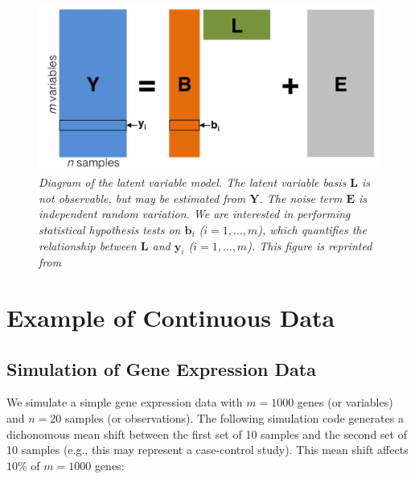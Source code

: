 \documentclass{article}\usepackage[]{graphicx}\usepackage[]{color}
\newcommand{\bY}{\bm{Y}}
\newcommand{\bL}{\bm{L}}
\newcommand{\bE}{\bm{E}}
\newcommand{\by}{\bm{y}}
\newcommand{\bb}{\bm{b}}
\begin{document}
\begin{figure}
\begin{center}
    \includegraphics[width=.8\textwidth]{fixed/LatentVariableModel.png}
  \caption{{\em Diagram of the latent variable model. The latent variable basis $\bL$ is not observable, but may be estimated from $\bY$. The noise term $\bE$ is independent random variation. We are interested in performing statistical hypothesis tests on $\bb_i$ ($i=1, \ldots, m$), which quantifies the relationship between $\bL$ and $\by_i$ ($i=1, \ldots, m$). \emph{This figure is reprinted from \cite{jackstraw}}}}
\label{LVM}
\end{center}
\end{figure}

\section{Example of Continuous Data}

\subsection{Simulation of Gene Expression Data}

We simulate a simple gene expression data with $m=1000$ genes (or variables) and $n=20$ samples (or observations). The following simulation code generates a dichonomous mean shift between the first set of 10 samples and the second set of 10 samples (e.g., this may represent a case-control study). This mean shift affects $10\%$ of $m=1000$ genes:
\end{document}
